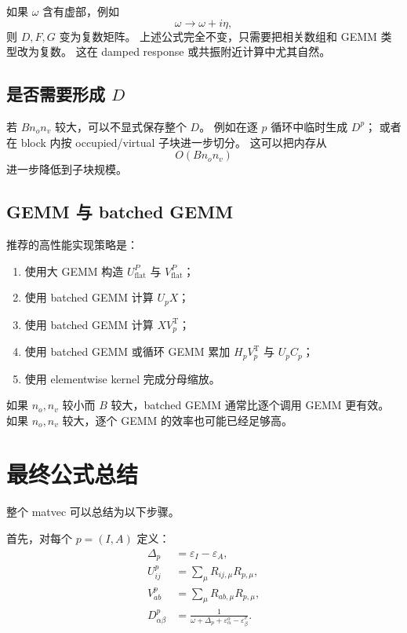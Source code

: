 \documentclass[UTF8,a4paper,11pt]{ctexart}
\newcommand{\eps}{\varepsilon}
\newcommand{\trans}{\mathrm{T}}
\begin{document}
如果 $\omega$ 含有虚部，例如
\begin{equation}
\omega \rightarrow \omega+i\eta,
\end{equation}
则 $D,F,G$ 变为复数矩阵。
上述公式完全不变，只需要把相关数组和 GEMM 类型改为复数。
这在 damped response 或共振附近计算中尤其自然。

\subsection{是否需要形成 $D$}

若 $B n_o n_v$ 较大，可以不显式保存整个 $D$。
例如在逐 $p$ 循环中临时生成 $D^p$；
或者在 block 内按 occupied/virtual 子块进一步切分。
这可以把内存从
\begin{equation}
O(Bn_on_v)
\end{equation}
进一步降低到子块规模。

\subsection{GEMM 与 batched GEMM}

推荐的高性能实现策略是：
\begin{enumerate}
  \item 使用大 GEMM 构造 $U_{\mathrm{flat}}^P$ 与 $V_{\mathrm{flat}}^P$；
  \item 使用 batched GEMM 计算 $U_pX$；
  \item 使用 batched GEMM 计算 $XV_p^{\trans}$；
  \item 使用 batched GEMM 或循环 GEMM 累加 $H_pV_p^{\trans}$ 与 $U_pC_p$；
  \item 使用 elementwise kernel 完成分母缩放。
\end{enumerate}

如果 $n_o,n_v$ 较小而 $B$ 较大，batched GEMM 通常比逐个调用 GEMM 更有效。
如果 $n_o,n_v$ 较大，逐个 GEMM 的效率也可能已经足够高。

\section{最终公式总结}

整个 matvec 可以总结为以下步骤。

首先，对每个 $p=(I,A)$ 定义：
\begin{align}
\Delta_p &= \eps_I-\eps_A,
\\
U^p_{ij} &= \sum_{\mu}R_{ij,\mu}R_{p,\mu},
\\
V^p_{ab} &= \sum_{\mu}R_{ab,\mu}R_{p,\mu},
\\
D^p_{\alpha\beta}
&=
\frac{1}{\omega+\Delta_p+\eps_\alpha^{o}-\eps_\beta^{v}}.
\end{align}
\end{document}

